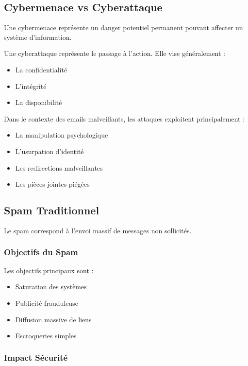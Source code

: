 \documentclass[12pt,a4paper]{article}
\begin{document}
\subsection{Cybermenace vs Cyberattaque}

Une cybermenace représente un danger potentiel permanent pouvant affecter un système d'information.

Une cyberattaque représente le passage à l'action. Elle vise généralement :
\begin{itemize}
    \item La confidentialité
    \item L'intégrité
    \item La disponibilité
\end{itemize}

Dans le contexte des emails malveillants, les attaques exploitent principalement :
\begin{itemize}
    \item La manipulation psychologique
    \item L'usurpation d'identité
    \item Les redirections malveillantes
    \item Les pièces jointes piégées
\end{itemize}

\subsection{Spam Traditionnel}

Le spam correspond à l'envoi massif de messages non sollicités.

\subsubsection{Objectifs du Spam}

Les objectifs principaux sont :
\begin{itemize}
    \item Saturation des systèmes
    \item Publicité frauduleuse
    \item Diffusion massive de liens
    \item Escroqueries simples
\end{itemize}

\subsubsection{Impact Sécurité}
\end{document}
